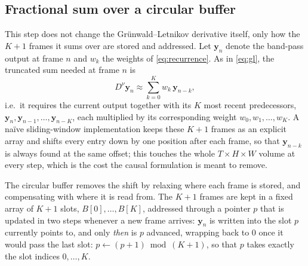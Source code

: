 \documentclass[conference]{IEEEtran}
\begin{document}
\subsection{Fractional sum over a circular buffer}

This step does not change the Gr\"unwald--Letnikov derivative itself, only how
the $K+1$ frames it sums over are stored and addressed. Let $\mathbf{y}_n$
denote the band-pass output at frame $n$ and $w_k$ the weights of
\eqref{eq:recurrence}. As in \eqref{eq:gl}, the truncated sum needed at frame
$n$ is
\begin{equation}
D^{\nu} \mathbf{y}_n \approx \sum_{k=0}^{K} w_k \, \mathbf{y}_{n-k},
\label{eq:gl-window}
\end{equation}
i.e.\ it requires the current output together with its $K$ most recent
predecessors, $\mathbf{y}_n, \mathbf{y}_{n-1}, \dots, \mathbf{y}_{n-K}$, each
multiplied by its corresponding weight $w_0, w_1, \dots, w_K$. A na\"ive
sliding-window implementation keeps these $K+1$ frames as an explicit array
and shifts every entry down by one position after each frame, so that
$\mathbf{y}_{n-k}$ is always found at the same offset; this touches the whole
$T\times H\times W$ volume at every step, which is the cost the causal
formulation is meant to remove.

The circular buffer removes the shift by relaxing where each frame is
stored, and compensating with where it is read from. The $K+1$ frames are
kept in a fixed array of $K+1$ slots, $B[0],\dots,B[K]$, addressed through a
pointer $p$ that is updated in two steps whenever a new frame arrives:
$\mathbf{y}_n$ is written into the slot $p$ currently points to, and only
\emph{then} is $p$ advanced, wrapping back to $0$ once it would pass the last
slot: $p \leftarrow (p+1) \bmod (K{+}1)$, so that $p$ takes exactly the slot
indices $0,\dots,K$.
\end{document}
